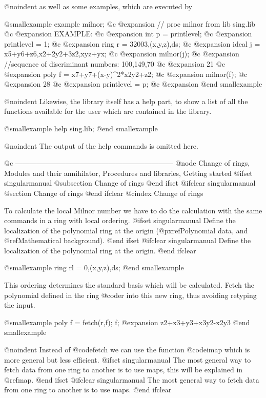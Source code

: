 @noindent as well as some examples, which are executed by

@smallexample
example milnor;
@c @expansion{} // proc milnor from lib sing.lib
@c @expansion{} EXAMPLE:
@c @expansion{}    int p      = printlevel;
@c @expansion{}    printlevel = 1;
@c @expansion{}    ring r     = 32003,(x,y,z),ds;
@c @expansion{}    ideal j    = x5+y6+z6,x2+2y2+3z2,xyz+yx;
@c @expansion{}    milnor(j);
@c @expansion{} //sequence of discriminant numbers: 100,149,70
@c @expansion{} 21
@c @expansion{}    poly f     = x7+y7+(x-y)^2*x2y2+z2;
@c @expansion{}    milnor(f);
@c @expansion{} 28
@c @expansion{}    printlevel = p;
@c @expansion{}
@end smallexample

@noindent Likewise, the library itself has a help part, to show a list of
all the functions
available for the user which are contained in the library.

@smallexample
help sing.lib;
@end smallexample

@noindent The output of the help commands is omitted here.

@c ------------------------------------------------------------------
@node Change of rings, Modules and their annihilator, Procedures and libraries, Getting started
@ifset singularmanual
@subsection Change of rings
@end ifset
@ifclear singularmanual
@section Change of rings
@end ifclear
@cindex Change of rings

To calculate the local Milnor number we have to do the calculation with the
same commands in a ring with local ordering.
@ifset singularmanual
Define the localization of the polynomial ring at the origin
(@pxref{Polynomial data}, and @ref{Mathematical background}).
@end ifset
@ifclear singularmanual
Define the localization of the polynomial ring at the origin.
@end ifclear

@smallexample
ring rl = 0,(x,y,z),ds;
@end smallexample

This ordering determines the standard basis which will be calculated.
Fetch the polynomial defined in the ring @code{r} into this new ring,
thus avoiding retyping the input.

@smallexample
poly f = fetch(r,f);
f;
@expansion{} z2+x3+y3+x3y2-x2y3
@end smallexample

@noindent Instead of @code{fetch} we can use the function @code{imap}
which is more general but less efficient.
@ifset singularmanual
The most general way to fetch data from one ring to another is to use maps,
this will be explained in @ref{map}.
@end ifset
@ifclear singularmanual
The most general way to fetch data from one ring to another is to use maps.
@end ifclear

